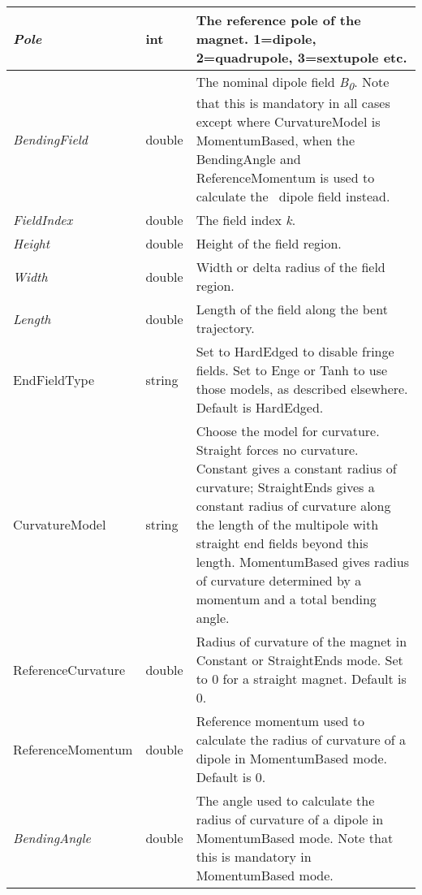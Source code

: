 \begin{center}
\tabletail{}
\tablelasttail{}
\begin{supertabular}{|m{3.689cm}|m{1.252cm}|m{10cm}|}
\hline
{\itshape Pole} &
int &
The reference pole of the magnet. 1=dipole, 2=quadrupole, 3=sextupole etc.\\\hline
{\itshape BendingField} &
double &
The nominal dipole field \textit{B}\textit{\textsubscript{0}}. Note that this is mandatory in all cases except where
CurvatureModel is MomentumBased, when the BendingAngle and ReferenceMomentum is used to calculate the \ dipole field
instead.\\\hline
{\itshape FieldIndex} &
double &
The field index \textit{k}.\\\hline
{\itshape Height} &
double &
Height of the field region.\\\hline
{\itshape Width} &
double &
Width or delta radius of the field region.\\\hline
{\itshape Length} &
double &
Length of the field along the bent trajectory.\\\hline
EndFieldType &
string &
Set to HardEdged to disable fringe fields. Set to Enge or Tanh to use those models, as described elsewhere. Default is
HardEdged.\\\hline
CurvatureModel &
string &
Choose the model for curvature. Straight forces no curvature. Constant gives a constant radius of curvature;
StraightEnds gives a constant radius of curvature along the length of the multipole with straight end fields beyond
this length. MomentumBased gives radius of curvature determined by a momentum and a total bending angle.\\\hline
ReferenceCurvature &
double &
Radius of curvature of the magnet in Constant or StraightEnds mode. Set to 0 for a straight magnet. Default is
0.\\\hline
ReferenceMomentum &
double &
Reference momentum used to calculate the radius of curvature of a dipole in MomentumBased mode. Default is 0.\\\hline
{\itshape BendingAngle} &
double &
The angle used to calculate the radius of curvature of a dipole in MomentumBased mode. Note that this is mandatory in
MomentumBased mode.\\\hline
\end{supertabular}
\end{center}

